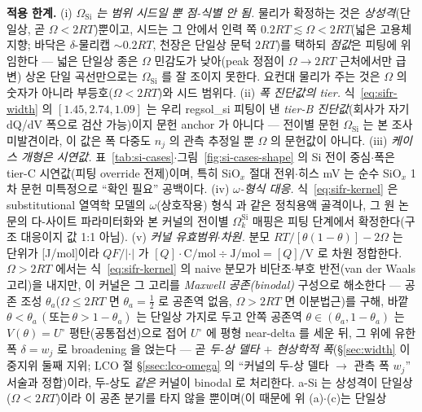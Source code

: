 \begin{warnbox}
\textbf{적용 한계.} (i) \emph{$\Omega_\mathrm{Si}$ 는 범위 시드일 뿐 점-식별 안 됨.} 물리가 확정하는 것은
\emph{상성격}(단일상, 곧 $\Omega<2RT$)뿐이고, 시드는 그 안에서 인력 쪽 $0.2RT\lesssim\Omega<2RT$(넓은 고용체 지향;
바닥은 $\delta$-물리캡 $\sim0.2RT$, 천장은 단일상 문턱 $2RT$)를 택하되 \emph{점값}은 피팅에 위임한다 --- 넓은
단일상 종은 $\Omega$ 민감도가 낮아(peak 정점이 $\Omega{\to}2RT$ 근처에서만 급변) 상온 단일 곡선만으로는
$\Omega_\mathrm{Si}$ 를 잘 조이지 못한다. 요컨대 물리가 주는 것은 $\Omega$ 의 숫자가 아니라 부등호($\Omega<2RT$)와
시드 범위다. (ii) \emph{폭 진단값의 tier.} 식~\eqref{eq:sifr-width} 의 $[1.45,2.74,1.09]$ 는 우리 regsol\_si 피팅이
낸 \emph{tier-B 진단값}(회사가 자기 dQ/dV 폭으로 검산 가능)이지 문헌 anchor 가 아니다 --- 전이별 문헌
$\Omega_\mathrm{Si}$ 는 본 조사 미발견이라, 이 값은 폭 다중도 $n_j$ 의 관측 추정일 뿐 $\Omega$ 의 문헌값이 아니다.
(iii) \emph{케이스 개형은 시연값.} 표~\ref{tab:si-cases}$\cdot$그림~\ref{fig:si-cases-shape} 의 Si 전이 중심$\cdot$폭은
tier-C 시연값(피팅 override 전제)이며, 특히 SiO$_x$ 절대 전위$\cdot$히스 mV 는 순수 SiO$_x$ 1차 문헌 미특정으로
``확인 필요'' 공백이다. (iv) \emph{$\omega$-형식 대응.} 식~\eqref{eq:sifr-kernel} 은 substitutional 열역학 모델의
$\omega$(상호작용) 형식 \cite{verbrugge2017} 과 같은 정칙용액 골격이나, 그 원 논문의 다-사이트 파라미터화와 본
커널의 전이별 $\Omega_k^\mathrm{Si}$ 매핑은 피팅 단계에서 확정한다(구조 대응이지 값 1:1 아님). (v) \emph{커널
유효범위$\cdot$차원.} 분모 $RT/[\theta(1-\theta)]-2\Omega$ 는 단위가 [J/mol]이라 $QF/|\cdot|$ 가
$[Q]{\cdot}\mathrm{C/mol}\div\mathrm{J/mol}={[Q]}/\mathrm V$ 로 차원 정합한다. $\Omega>2RT$ 에서는 식~\eqref{eq:sifr-kernel} 의 naive 분모가 비단조$\cdot$부호 반전(van der Waals 고리)을
내지만, 이 커널은 그 고리를 \emph{Maxwell 공존(binodal)} 구성으로 해소한다 ---
공존 조성 $\theta_a$($\Omega\!\le\!2RT$ 면 $\theta_a{=}\tfrac12$ 로 공존역 없음,
$\Omega\!>\!2RT$ 면 이분법근)를 구해, 바깥 $\theta\!<\!\theta_a\,(\text{또는}\,\theta\!>\!1{-}\theta_a)$ 는 단일상
가지로 두고 안쪽 공존역 $\theta\!\in\!(\theta_a,1{-}\theta_a)$ 는 $V(\theta){=}U^\circ$ 평탄(공통접선)으로 접어
$U^\circ$ 에 평형 near-delta 를 세운 뒤, 그 위에 유한 폭 $\delta{=}w_j$ 로 broadening 을 얹는다 ---
곧 \emph{두-상 델타 $+$ 현상학적 폭}(\S\ref{sec:width} 이중지위 둘째 지위; LCO 절 \S\ref{ssec:lco-omega} 의
``커널의 두-상 델타 $\to$ 관측 폭 $w_j$'' 서술과 정합)이라, 두-상도 \emph{같은} 커널이 binodal 로 처리한다.
a-Si 는 상성격이 단일상($\Omega<2RT$)이라 이 공존 분기를 타지 않을 뿐이며(이 때문에 위 (a)$\cdot$(c)는 단일상

\end{warnbox}
